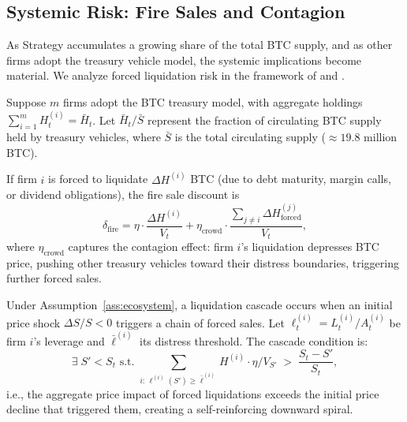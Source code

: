 \subsection{Systemic Risk: Fire Sales and Contagion}\label{subsec:systemic}

As Strategy accumulates a growing share of the total BTC supply, and as
other firms adopt the treasury vehicle model, the systemic implications
become material.  We analyze forced liquidation risk in the framework of
\citet{shleifer1997limits} and \citet{shleifer2011fire}.

\begin{assumption}\label{ass:ecosystem}
Suppose $m$ firms adopt the BTC treasury model, with aggregate holdings
$\sum_{i=1}^m H_t^{(i)} = \bar{H}_t$.  Let $\bar{H}_t / \bar{S}$
represent the fraction of circulating BTC supply held by treasury
vehicles, where $\bar{S}$ is the total circulating supply
($\approx 19.8$ million BTC).
\end{assumption}

\begin{definition}\label{def:fire_sale}
If firm $i$ is forced to liquidate $\Delta H^{(i)}$ BTC (due to
debt maturity, margin calls, or dividend obligations), the fire sale
discount is
\begin{equation}\label{eq:fire_discount}
  \delta_{\mathrm{fire}}
  = \eta \cdot \frac{\Delta H^{(i)}}{V_t}
    + \eta_{\mathrm{crowd}} \cdot \frac{\sum_{j \ne i}
    \Delta H_{\mathrm{forced}}^{(j)}}{V_t},
\end{equation}
where $\eta_{\mathrm{crowd}}$ captures the contagion effect: firm $i$'s
liquidation depresses BTC price, pushing other treasury vehicles toward
their distress boundaries, triggering further forced sales.
\end{definition}

\begin{theorem}\label{thm:cascade}
Under Assumption~\ref{ass:ecosystem}, a liquidation cascade occurs when
an initial price shock $\Delta S / S < 0$ triggers a chain of forced sales.
Let $\ell^{(i)}_t = L_t^{(i)} / A_t^{(i)}$ be firm $i$'s leverage and
$\bar{\ell}^{(i)}$ its distress threshold.  The cascade condition is:
\begin{equation}\label{eq:cascade_condition}
  \exists\; S' < S_t \text{ s.t. }
  \sum_{i:\, \ell^{(i)}(S') \ge \bar{\ell}^{(i)}}
  H^{(i)} \cdot \eta / V_{S'}
  \;>\; \frac{S_t - S'}{S_t},
\end{equation}
i.e., the aggregate price impact of forced liquidations exceeds the
initial price decline that triggered them, creating a self-reinforcing
downward spiral.
\end{theorem}

